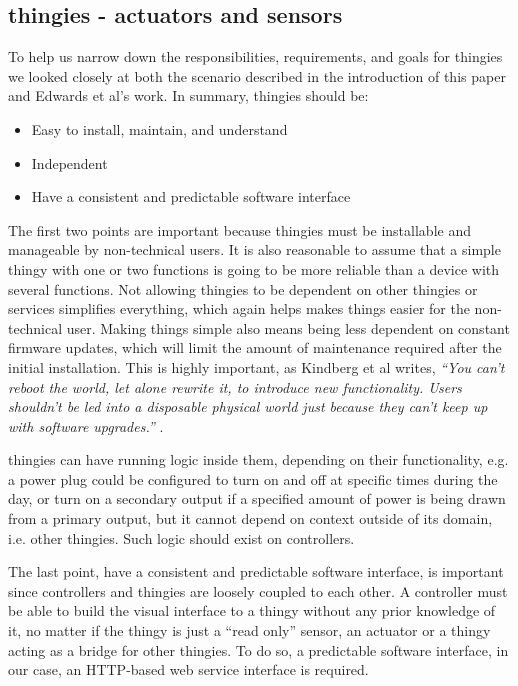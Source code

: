 \documentclass{ubicomp2012}
\begin{document}
\subsection{thingies - actuators and sensors}

To help us narrow down the responsibilities, requirements, and goals for thingies we looked closely at both the scenario described in the introduction of this paper and Edwards et al's \cite{Edwards01athome} work. In summary, thingies should be:

\begin{itemize}
\item Easy to install, maintain, and understand
\item Independent
\item Have a consistent and predictable software interface
\end{itemize}

The first two points are important because thingies must be installable and manageable by non-technical users. It is also reasonable to assume that a simple thingy with one or two functions is going to be more reliable than a device with several functions. Not allowing thingies to be dependent on other thingies or services simplifies everything, which again helps makes things easier for the non-technical user. Making things simple also means being less dependent on constant firmware updates, which will limit the amount of maintenance required after the initial installation. This is highly important, as Kindberg et al writes, \textit{ ``You can't reboot the world, let alone rewrite it, to introduce new functionality. Users shouldn't be led into a disposable physical world just because they can't keep up with software upgrades.''} \cite{kindbergSystem}.

thingies can have running logic inside them, depending on their functionality, e.g. a power plug could be configured to turn on and off at specific times during the day, or turn on a secondary output if a specified amount of power is being drawn from a primary output, but it cannot depend on context outside of its domain, i.e. other thingies. Such logic should exist on controllers.

The last point, have a consistent and predictable software interface, is important since controllers and thingies are loosely coupled to each other. A controller must be able to build the visual interface to a thingy without any prior knowledge of it, no matter if the thingy is just a ``read only'' sensor, an actuator or a thingy acting as a bridge for other thingies. To do so, a predictable software interface, in our case, an HTTP-based web service interface is required.
\end{document}
